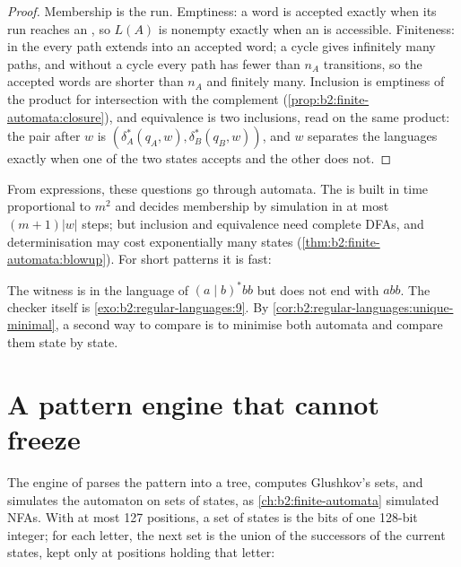 \begin{proof}
Membership is the run. Emptiness: a word is accepted exactly when its run reaches an , so $L(A)$ is
nonempty exactly when an  is accessible. Finiteness: in the  every path extends into an
accepted word; a cycle gives infinitely many paths, and without a cycle every path has fewer than $n_A$ transitions, so
the accepted words are shorter than $n_A$ and finitely many. Inclusion is emptiness of the product for intersection
with the complement (\cref{prop:b2:finite-automata:closure}), and equivalence is two inclusions, read on the same
product: the pair after $w$ is $(\delta_A^*(q_A, w), \delta_B^*(q_B, w))$, and $w$ separates the languages exactly when
one of the two states accepts and the other does not.
\end{proof}

From expressions, these questions go through automata. The  is built in time proportional to $m^2$
and decides membership by simulation in at most $(m + 1)|w|$ steps; but inclusion and equivalence need complete DFAs,
and determinisation may cost exponentially many states (\cref{thm:b2:finite-automata:blowup}). For short patterns it is
fast:

\label{out:b2:regular-languages:equivalent}

The witness  is in the language of $(a \mid b)^*bb$ but does not end with $abb$. The checker itself is
\cref{exo:b2:regular-languages:9}. By \cref{cor:b2:regular-languages:unique-minimal}, a second way to compare is to
minimise both automata and compare them state by state.

\section{A pattern engine that cannot freeze}\label{sec:b2:regular-languages:engine}

The engine of  parses the pattern into a tree, computes Glushkov's sets, and simulates the automaton
on sets of states, as \cref{ch:b2:finite-automata} simulated NFAs. With at most 127 positions, a set of states is the
bits of one 128-bit integer; for each letter, the next set is the union of the successors of the current states, kept
only at positions holding that letter:

